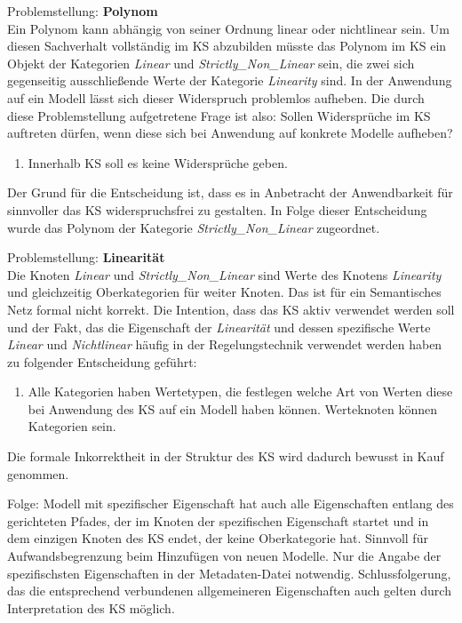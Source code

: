 Problemstellung: \textbf{Polynom}\\
Ein Polynom kann abhängig von seiner Ordnung linear oder nichtlinear sein. Um diesen Sachverhalt vollständig im KS abzubilden müsste das Polynom im KS ein Objekt der Kategorien \textit{Linear} und \textit{Strictly\_Non\_Linear} sein, die zwei sich gegenseitig ausschließende Werte der Kategorie \textit{Linearity} sind. In der Anwendung auf ein Modell lässt sich dieser Widerspruch problemlos aufheben. Die durch diese Problemstellung aufgetretene Frage ist also: Sollen Widersprüche im KS auftreten dürfen, wenn diese sich bei Anwendung auf konkrete Modelle aufheben?
\begin{enumerate}[resume*]
	\item \label{E.KS_Widersprüche}Innerhalb KS soll es keine Widersprüche geben.
\end{enumerate}
Der Grund für die Entscheidung ist, dass es in Anbetracht der Anwendbarkeit für sinnvoller das KS widerspruchsfrei zu gestalten. In Folge dieser Entscheidung wurde das Polynom der Kategorie \textit{Strictly\_Non\_Linear} zugeordnet.

Problemstellung: \textbf{Linearität}\\
Die Knoten \textit{Linear} und \textit{Strictly\_Non\_Linear} sind Werte des Knotens \textit{Linearity} und gleichzeitig Oberkategorien für weiter Knoten. Das ist für ein Semantisches Netz formal nicht korrekt. Die Intention, dass das KS aktiv verwendet werden soll und der Fakt, das die Eigenschaft der \textit{Linearität} und dessen spezifische Werte \textit{Linear} und \textit{Nichtlinear} häufig in der Regelungstechnik verwendet werden haben zu folgender Entscheidung geführt: 
\begin{enumerate}[resume*]
	\item \label{E.KS_Werteknoten}Alle Kategorien haben Wertetypen, die festlegen welche Art von Werten diese bei Anwendung des KS auf ein Modell haben können. Werteknoten können Kategorien sein.
\end{enumerate}
Die formale Inkorrektheit in der Struktur des KS wird dadurch bewusst in Kauf genommen.

Folge: Modell mit spezifischer Eigenschaft hat auch alle Eigenschaften entlang des gerichteten Pfades, der im Knoten der spezifischen Eigenschaft startet und in dem einzigen Knoten des KS endet, der keine Oberkategorie hat. Sinnvoll für Aufwandsbegrenzung beim Hinzufügen von neuen Modelle. Nur die Angabe der spezifischsten Eigenschaften in der Metadaten-Datei notwendig. Schlussfolgerung, das die entsprechend verbundenen allgemeineren Eigenschaften auch gelten durch Interpretation des KS möglich. 











